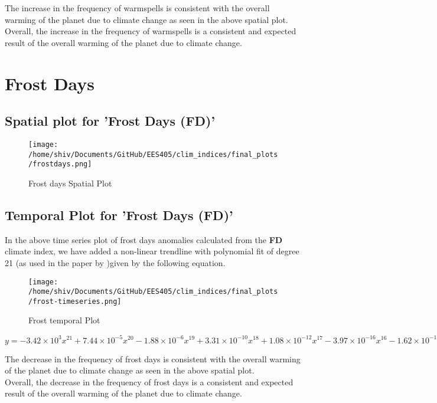 \documentclass[a4paper, 12pt, twoside]{report}
\begin{document}
The increase in the frequency of warmspells is consistent with the overall warming of the planet due to climate change as seen in the above spatial plot.\\
Overall, the increase in the frequency of warmspells is a consistent and expected result of the overall warming of the planet due to climate change.

\section{Frost Days}
\newpage
\subsection{Spatial plot for 'Frost Days (FD)'}


\begin{figure}[htb]
    \centering
    \texttt{[image: /home/shiv/Documents/GitHub/EES405/clim\_indices/final\_plots/frostdays.png]}
    \caption{Frost days Spatial Plot}
    \label{fig:frost_spatial}
\end{figure}

\subsection{Temporal Plot for 'Frost Days (FD)'}
In the above time series plot of frost days anomalies calculated from the \textbf{FD} climate index, we have added a non-linear trendline with polynomial fit of degree 21 (as used in the paper by )given by the following equation. \\
\begin{figure}[htb]
    \centering
    \texttt{[image: /home/shiv/Documents/GitHub/EES405/clim\_indices/final\_plots/frost-timeseries.png]}
    \caption{Frost temporal Plot}
    \label{fig:frost_temporal}
\end{figure}

$ y = -3.42\times10^{3}x^{21}+7.44\times10^{-5}x^{20}-1.88\times10^{-6}x^{19}+3.31\times10^{-10}x^{18}+1.08\times10^{-12}x^{17}-3.97\times10^{-16}x^{16}-1.62\times10^{-19}x^{15}+1.05\times10^{-22}x^{14}-5.80\times10^{-27}x^{13}-8.00\times10^{-30}x^{12}+2.29\times10^{-33}x^{11}-1.20\times10^{-37}x^{10}-6.72\times10^{-41}x^{9}+1.99\times10^{-44}x^{8}-2.95\times10^{-48}x^{7}+2.85\times10^{-52}x^{6}-1.92\times10^{-56}x^{5}+9.12\times10^{-61}x^{4}-3.03\times10^{-65}x^{3}+6.69\times10^{-70}x^{2}-8.87\times10^{-75}x+5.34\times10^{-80}$

The decrease in the frequency of frost days is consistent with the overall warming of the planet due to climate change as seen in the above spatial plot.\\
Overall, the decrease in the frequency of frost days is a consistent and expected result of the overall warming of the planet due to climate change.
\end{document}
